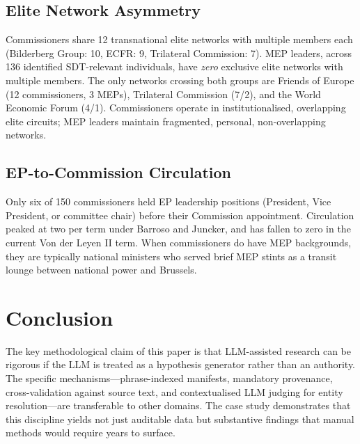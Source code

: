\documentclass[11pt,a4paper]{article}
\begin{document}
\subsection{Elite Network Asymmetry}

Commissioners share 12 transnational elite networks with multiple members each (Bilderberg Group: 10, ECFR: 9, Trilateral Commission: 7). MEP leaders, across 136 identified SDT-relevant individuals, have \emph{zero} exclusive elite networks with multiple members. The only networks crossing both groups are Friends of Europe (12 commissioners, 3 MEPs), Trilateral Commission (7/2), and the World Economic Forum (4/1). Commissioners operate in institutionalised, overlapping elite circuits; MEP leaders maintain fragmented, personal, non-overlapping networks.

\subsection{EP-to-Commission Circulation}

Only six of 150 commissioners held EP leadership positions (President, Vice President, or committee chair) before their Commission appointment. Circulation peaked at two per term under Barroso and Juncker, and has fallen to zero in the current Von der Leyen II term. When commissioners do have MEP backgrounds, they are typically national ministers who served brief MEP stints as a transit lounge between national power and Brussels.

\section{Conclusion}

The key methodological claim of this paper is that LLM-assisted research can be rigorous if the LLM is treated as a hypothesis generator rather than an authority. The specific mechanisms---phrase-indexed manifests, mandatory provenance, cross-validation against source text, and contextualised LLM judging for entity resolution---are transferable to other domains. The case study demonstrates that this discipline yields not just auditable data but substantive findings that manual methods would require years to surface.
\end{document}
